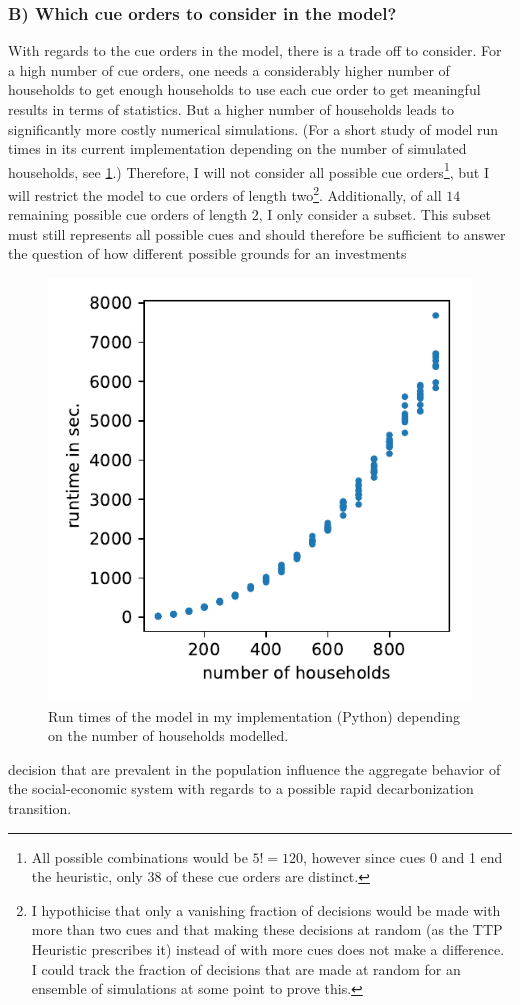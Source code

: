 \subsubsection*{B) Which cue orders to consider in the model?}
With regards to the cue orders in the model, there is a trade off to consider. For a high number of cue orders, one needs a considerably higher number of households to get enough households to use each cue order to get meaningful results in terms of statistics. But a higher number of households leads to significantly more costly numerical simulations. (For a short study of model run times in its current implementation depending on the number of simulated households, see \cref{fig:runtime}.) Therefore, I will not consider all possible cue orders\footnote{All possible combinations would be $5!=120$, however since cues 0 and 1 end the heuristic, only $38$ of these cue orders are distinct.}, but I will restrict the model to cue orders of length two\footnote{I hypothicise that only a vanishing fraction of decisions would be made with more than two cues and that making these decisions at random (as the TTP Heuristic prescribes it) instead of with more cues does not make a difference. I could track the fraction of decisions that are made at random for an ensemble of simulations at some point to prove this.}. Additionally, of all $14$ remaining possible cue orders of length $2$, I only consider a subset. This subset must still represents all possible cues and should therefore be sufficient to answer the question of how different possible grounds for an investments
\begin{figure}
	\vspace{-.4 cm}
        \hspace{-1.9 cm}
        \includegraphics[width = .55 \textwidth]{./figures/runtime.pdf}
        \caption[Model run time depending on number of households]{Run times of the model in my implementation (Python) depending on the number of households modelled.\label{fig:runtime}}
\end{figure}
decision that are prevalent in the population influence the aggregate behavior of the social-economic system with regards to a possible rapid decarbonization transition.\\

